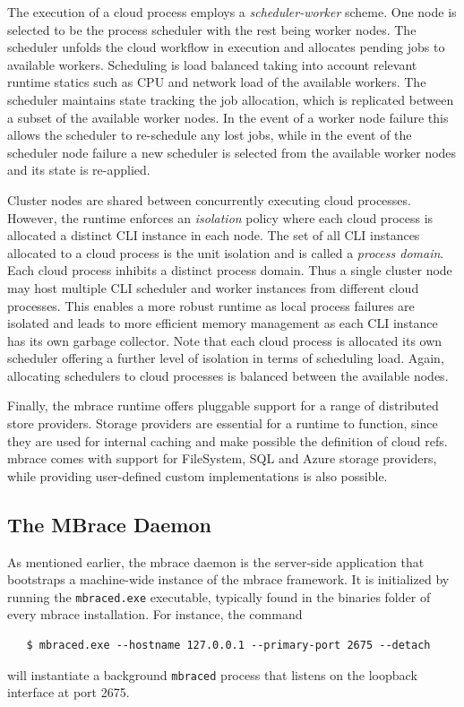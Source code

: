 \documentclass[9pt,a4paper]{article}
\newcommand{\mbrace}{mbrace}
\newcommand{\TitularMbrace}{MBrace}
\begin{document}
The execution of a cloud process employs a \emph{scheduler-worker} scheme. One
node is selected to be the process scheduler with the rest being worker
nodes. The scheduler unfolds the cloud workflow in execution and allocates
pending jobs to available workers. Scheduling is load balanced taking into
account relevant runtime statics such as CPU and network load of the available
workers. The scheduler maintains state tracking the job allocation, which is
replicated between a subset of the available worker nodes. In the event of a
worker node failure this allows the scheduler to re-schedule any lost jobs,
while in the event of the scheduler node failure a new scheduler is selected
from the available worker nodes and its state is re-applied.

Cluster nodes are shared between concurrently executing cloud
processes. However, the runtime enforces an \emph{isolation} policy where each
cloud process is allocated a distinct CLI instance in each node. The set of all
CLI instances allocated to a cloud process is the unit isolation and is called a
\emph{process domain}. Each cloud process inhibits a distinct process
domain. Thus a single cluster node may host multiple CLI scheduler and worker
instances from different cloud processes. This enables a more robust runtime as
local process failures are isolated and leads to more efficient memory
management as each CLI instance has its own garbage collector. Note that each
cloud process is allocated its own scheduler offering a further level of
isolation in terms of scheduling load. Again, allocating schedulers to cloud
processes is balanced between the available nodes.

Finally, the \mbrace{} runtime offers pluggable support for a range of
distributed store providers. Storage providers are essential for a runtime to
function, since they are used for internal caching and make possible the
definition of cloud refs. \mbrace{} comes with support for FileSystem, SQL and
Azure storage providers, while providing user-defined custom implementations is
also possible.

\subsection{The \TitularMbrace{} Daemon}

As mentioned earlier, the \mbrace{} daemon is the server-side application that
bootstraps a machine-wide instance of the \mbrace{} framework. It is initialized by
running the \texttt{mbraced.exe} executable, typically found in the binaries
folder of every \mbrace{} installation. For instance, the command
\begin{verbatim}
   $ mbraced.exe --hostname 127.0.0.1 --primary-port 2675 --detach
\end{verbatim}
will instantiate a background \texttt{mbraced} process that listens on
the loopback interface at port 2675.
\end{document}
